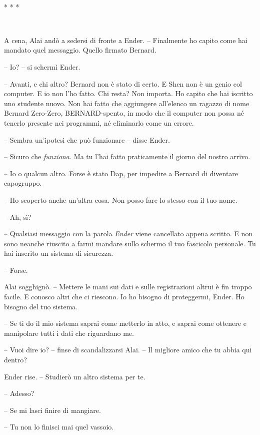 {~}

\begin{center}
	{* * *}
\end{center}

{~}

{A cena, Alai andò a sedersi di fronte a Ender. -- Finalmente ho capito
	come hai mandato quel messaggio. Quello firmato Bernard.}

{-- Io? -- si schermì Ender.}

{-- Avanti, e chi altro? Bernard non è stato di certo. E Shen non è un
	genio col computer. E io non l'ho fatto. Chi resta? Non importa. Ho
	capito che hai iscritto uno studente nuovo. Non hai fatto che aggiungere
	all'elenco un ragazzo di nome Bernard Zero-Zero, BERNARD-spento, in modo
	che il computer non possa né tenerlo presente nei programmi, né
	eliminarlo come un errore.}

{-- Sembra un'ipotesi che può funzionare -- disse Ender.}

{-- Sicuro che \emph{funziona.} Ma tu l'hai fatto praticamente il giorno
	del nostro arrivo.}

{-- Io o qualcun altro. Forse è stato Dap, per impedire a Bernard di
	diventare capogruppo.}

{-- Ho scoperto anche un'altra cosa. Non posso fare lo stesso con il tuo
	nome.}

{-- Ah, sì?}

{-- Qualsiasi messaggio con la parola \emph{Ender} viene cancellato
	appena scritto. E non sono neanche riuscito a farmi mandare sullo
	schermo il tuo fascicolo personale. Tu hai inserito un sistema di
	sicurezza.}

{-- Forse.}

{Alai sogghignò. -- Mettere le mani sui dati e sulle registrazioni
	altrui è fin troppo facile. E conosco altri che ci riescono. Io ho
	bisogno di proteggermi, Ender. Ho bisogno del tuo sistema.}

{-- Se ti do il mio sistema saprai come metterlo in atto, e saprai come
	ottenere e manipolare tutti i dati che riguardano me.}

{-- Vuoi dire io? -- finse di scandalizzarsi Alai. -- Il migliore amico
	che tu abbia qui dentro?}

{Ender rise. -- Studierò un altro sistema per te.}

{-- Adesso?}

{-- Se mi lasci finire di mangiare.}

{-- Tu non lo finisci mai quel vassoio.}

